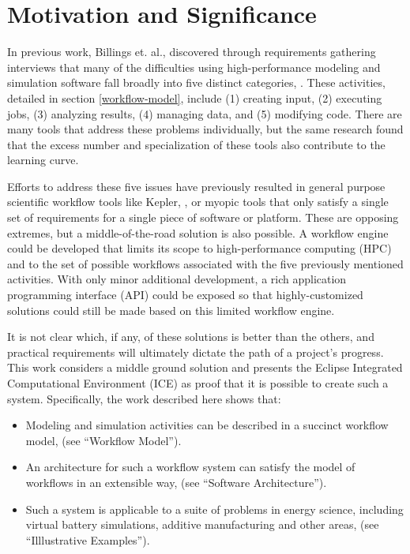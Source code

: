 \section{Motivation and Significance}\label{motivation-and-significance}

In previous work, Billings et. al., discovered through requirements
gathering interviews that many of the difficulties using
high-performance modeling and simulation software fall broadly into five
distinct categories, \cite{billings_designing_2009}. These activities,
detailed in section \ref{workflow-model}, include (1) creating input,
(2) executing jobs, (3) analyzing results, (4) managing data, and (5)
modifying code. There are many tools that address these problems
individually, but the same research found that the excess number and
specialization of these tools also contribute to the learning curve.

Efforts to address these five issues have previously resulted in general
purpose scientific workflow tools like Kepler, 
\cite{ludascher_scientific_2006}, or myopic tools that only satisfy a single
set of requirements for a single piece of software or platform. These
are opposing extremes, but a middle-of-the-road solution is also
possible. A workflow engine could be developed that limits its scope to
high-performance computing (HPC) and to the set of possible workflows
associated with the five previously mentioned activities. With only
minor additional development, a rich application programming interface
(API) could be exposed so that highly-customized solutions could still
be made based on this limited workflow engine.

It is not clear which, if any, of these solutions is better than the
others, and practical requirements will ultimately dictate the path of a
project's progress. This work considers a middle ground solution and
presents the Eclipse Integrated Computational Environment (ICE) as proof
that it is possible to create such a system. Specifically, the work
described here shows that:

\begin{itemize}
\item
  Modeling and simulation activities can be described in a succinct
  workflow model, (see ``Workflow Model'').
\item
  An architecture for such a workflow system can satisfy the model of
  workflows in an extensible way, (see ``Software Architecture'').
\item
  Such a system is applicable to a suite of problems in energy science,
  including virtual battery simulations, additive manufacturing and
  other areas, (see ``Illlustrative Examples'').
\end{itemize}

